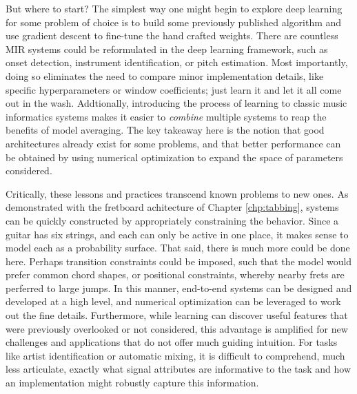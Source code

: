 But where to start?
The simplest way one might begin to explore deep learning for some problem of choice is to build some previously published algorithm and use gradient descent to fine-tune the hand crafted weights.
There are countless MIR systems could be reformulated in the deep learning framework, such as onset detection, instrument identification, or pitch estimation.
Most importantly, doing so eliminates the need to compare minor implementation details, like specific hyperparameters or window coefficients;
just learn it and let it all come out in the wash.
Addtionally, introducing the process of learning to classic music informatics systems makes it easier to \emph{combine} multiple systems to reap the benefits of model averaging.
The key takeaway here is the notion that good architectures already exist for some problems, and that better performance can be obtained by using numerical optimization to expand the space of parameters considered.

Critically, these lessons and practices transcend known problems to new ones.
As demonstrated with the fretboard achitecture of Chapter \ref{chp:tabbing}, systems can be quickly constructed by appropriately constraining the behavior.
Since a guitar has six strings, and each can only be active in one place, it makes sense to model each as a probability surface.
That said, there is much more could be done here.
Perhaps transition constraints could be imposed, such that the model would prefer common chord shapes, or positional constraints, whereby nearby frets are perferred to large jumps.
In this manner, end-to-end systems can be designed and developed at a high level, and numerical optimization can be leveraged to work out the fine details.
Furthermore, while learning can discover useful features that were previously overlooked or not considered, this advantage is amplified for new challenges and applications that do not offer much guiding intuition.
For tasks like artist identification or automatic mixing, it is difficult to comprehend, much less articulate, exactly what signal attributes are informative to the task and how an implementation might robustly capture this information.


